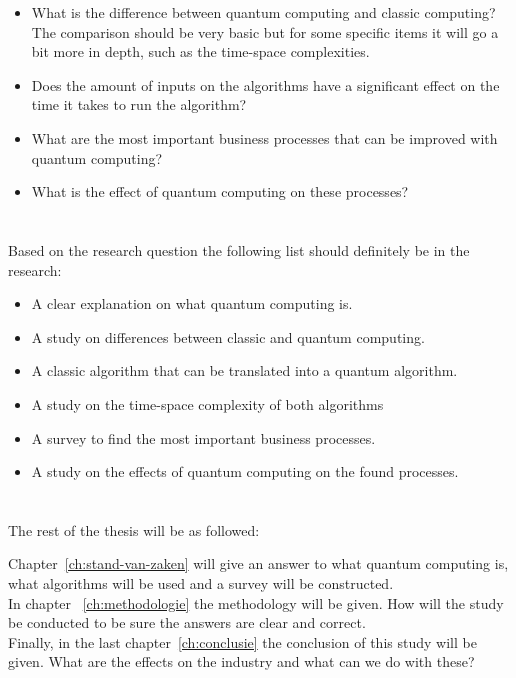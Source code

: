 \begin{itemize}
  \item What is the difference between quantum computing and classic computing? The comparison should be very basic but for some specific items it will go a bit more in depth, such as the time-space complexities.
  \item Does the amount of inputs on the algorithms have a significant effect on the time it takes to run the algorithm?
  \item What are the most important business processes that can be improved with quantum computing?
  \item What is the effect of quantum computing on these processes?
\end{itemize}

\section{}
\label{sec:onderzoeksdoelstelling}

Based on the research question the following list should definitely be in the research:

\begin{itemize}
  \item A clear explanation on what quantum computing is.
  \item A study on differences between classic and quantum computing.
  \item A classic algorithm that can be translated into a quantum algorithm.
  \item A study on the time-space complexity of both algorithms
  \item A survey to find the most important business processes.
  \item A study on the effects of quantum computing on the found processes.
\end{itemize}

\section{}
\label{sec:opzet-bachelorproef}

The rest of the thesis will be as followed:

Chapter~\ref{ch:stand-van-zaken} will give an answer to what quantum computing is, what algorithms will be used and a survey will be constructed. \\
In chapter ~\ref{ch:methodologie} the methodology will be given. How will the study be conducted to be sure the answers are clear and correct. \\
Finally, in the last chapter~\ref{ch:conclusie} the conclusion of this study will be given. What are the effects on the industry and what can we do with these?
